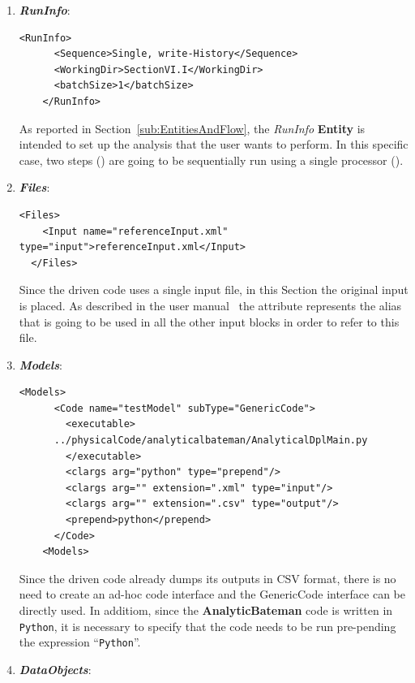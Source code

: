  \begin{enumerate}
   \item \textbf{\textit{RunInfo}}:
\begin{lstlisting}[style=XML,morekeywords={arg,extension,pauseAtEnd,overwrite}]
    <RunInfo>
      <Sequence>Single, write-History</Sequence>
      <WorkingDir>SectionVI.I</WorkingDir>
      <batchSize>1</batchSize>
    </RunInfo>   
\end{lstlisting}   
   As reported in Section~\ref{sub:EntitiesAndFlow}, the \textit{RunInfo} \textbf{Entity} is intended to set up the analysis 
   that the user wants to perform. In this specific case, two steps () are going to be sequentially run 
   using a single processor ().
   
   \item \textbf{\textit{Files}}:
\begin{lstlisting}[style=XML,morekeywords={arg,extension,pauseAtEnd,overwrite}]
  <Files>
    <Input name="referenceInput.xml" type="input">referenceInput.xml</Input>
  </Files>
\end{lstlisting}
   Since the driven code uses a single input file, in this Section the original input is placed. As described in the user manual~\cite{}
   the attribute   represents the alias that is going to be used in all the other input blocks in order to 
   refer to this file.
   \item \textbf{\textit{Models}}:
\begin{lstlisting}[style=XML,morekeywords={arg,extension,pauseAtEnd,overwrite}]
   <Models>
      <Code name="testModel" subType="GenericCode">
        <executable>
      ../physicalCode/analyticalbateman/AnalyticalDplMain.py
        </executable>
        <clargs arg="python" type="prepend"/>
        <clargs arg="" extension=".xml" type="input"/>
        <clargs arg="" extension=".csv" type="output"/>
        <prepend>python</prepend>
      </Code>
    <Models>
\end{lstlisting}
  Since the driven code already dumps its outputs in CSV format, there is no need to create
  an ad-hoc code interface and the GenericCode interface can be directly used. In additiom, since the \textbf{AnalyticBateman} code
  is written in \texttt{Python}, it is necessary to specify that the code needs to be run pre-pending the expression ``\texttt{Python}''. 
   \item \textbf{\textit{DataObjects}}:
\begin{lstlisting}[style=XML,morekeywords={arg,extension,pauseAtEnd,overwrite}]

\end{lstlisting}
\end{enumerate}
